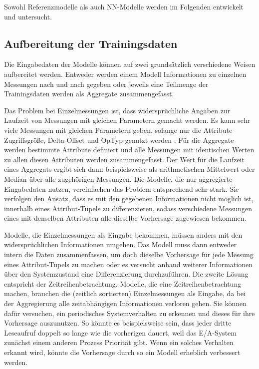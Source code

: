 \documentclass[
	twoside,
	12pt,
	a4paper,
	BCOR10mm,
	DIV14,
	listof=totoc,
	bibliography=totoc,
	headsepline
]{scrreprt}
\begin{document}
Sowohl Referenzmodelle als auch NN-Modelle werden im Folgenden entwickelt und untersucht.
\subsection{Aufbereitung der Trainingsdaten}
Die Eingabedaten der Modelle können auf zwei grundsätzlich verschiedene Weisen aufbereitet werden.
Entweder werden einem Modell Informationen zu einzelnen Messungen nach und nach gegeben oder jeweils eine Teilmenge der Trainingsdaten werden als Aggregate zusammengefasst.\medskip

Das Problem bei Einzelmessungen ist, dass \glqq widersprüchliche\grqq{} Angaben zur Laufzeit von Messungen mit gleichen Parametern gemacht werden. Es kann sehr viele Messungen mit gleichen Parametern geben, solange nur die Attribute Zugriffsgröße, Delta-Offset und OpTyp genutzt werden . 
Für die Aggregate werden bestimmte Attribute definiert und alle Messungen mit identischen Werten zu allen diesen Attributen werden zusammengefasst.
Der Wert für die Laufzeit eines Aggregats ergibt sich dann beispielsweise als arithmetischen Mittelwert oder Median über alle zugehörigen Messungen.
Die Modelle, die nur aggregierte Eingabedaten nutzen, vereinfachen das Problem entsprechend sehr stark. Sie verfolgen den Ansatz, dass es mit den gegebenen Informationen nicht möglich ist, innerhalb eines Attribut-Tupels zu differenzieren, sodass verschiedene Messungen eines mit denselben Attributen alle dieselbe Vorhersage zugewiesen bekommen.

Modelle, die Einzelmessungen als Eingabe bekommen, müssen anders mit den \glqq widersprüchlichen\grqq{} Informationen umgehen.
Das Modell muss dann entweder intern die Daten zusammenfassen, um doch dieselbe Vorhersage für jede Messung eines Attribut-Tupels zu machen oder es versucht anhand weiterer Informationen über den Systemzustand eine Differenzierung durchzuführen.
Die zweite Lösung entspricht der Zeitreihenbetrachtung.
Modelle, die eine Zeitreihenbetrachtung machen, brauchen die (zeitlich sortierten) Einzelmessungen als Eingabe, da bei der Aggregierung alle zeitabhängigen Informationen verloren gehen.
Sie können dafür versuchen, ein periodisches Systemverhalten zu erkennen und dieses für ihre Vorhersage auszunutzen. So könnte es beispielsweise sein, dass jeder dritte Leseaufruf doppelt so lange wie die vorherigen dauert, weil das E/A-System zunächst einem anderen Prozess Priorität gibt.
Wenn ein solches Verhalten erkannt wird, könnte die Vorhersage durch so ein Modell erheblich verbessert werden.
\end{document}
